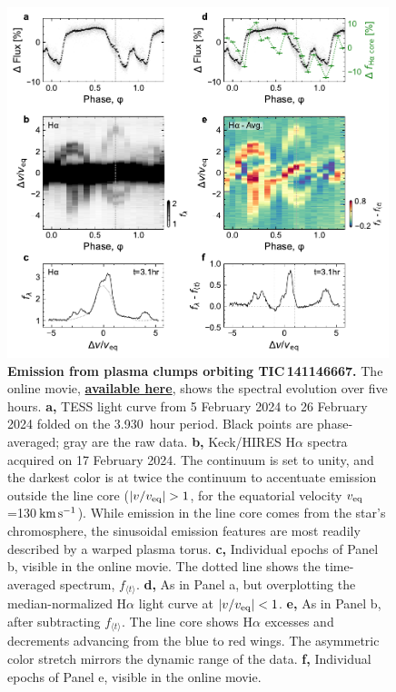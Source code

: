 \documentclass[11pt,twocolumn,tighten,linenumbers]{aastex7}
\newcommand{\kms}{\ensuremath{\rm km\,s^{-1}}}
\newcommand{\periodhr}{3.930}
\begin{document}
\begin{figure}[!t]
  \centering
  \includegraphics[width=0.99\textwidth]{f3.pdf}
  \vspace{-0.3cm}
  \captionsetup{labelformat=moviefmt,labelsep=colon}
	\caption{\textbf{Emission from plasma clumps orbiting
TIC\,141146667.}
  The online movie,
  \href{https://lgbouma.com/movies/TIC141146667_sixpanel.mp4}{{\bf
  available here}},
  shows the spectral evolution over five hours.
  {\bf a,} TESS light curve from 5 February 2024 to 26
  February 2024 folded on the \periodhr\ hour period.  Black
  points are phase-averaged; gray are the raw data.
  {\bf b,} Keck/HIRES H$\alpha$ spectra acquired on 17 February 2024.
  The continuum is set to unity, and the darkest color is at twice the
  continuum to accentuate emission outside the line core ($|v/v_{\rm
  eq}|>1$, for the equatorial velocity $v_{\rm eq}$=130\,\kms).  While
  emission in the line core comes from the star's chromosphere, the
  sinusoidal emission features are most readily described by a warped
  plasma torus.
  {\bf c,} Individual epochs of Panel b, visible in the online movie.
  The dotted line shows the time-averaged spectrum, $f_{\langle t
  \rangle}$.
  {\bf d,} As in Panel a, but overplotting the
  median-normalized H$\alpha$ light curve at $|v/v_{\rm eq}|<1$.
  {\bf e,} As in Panel b, after subtracting $f_{\langle t
  \rangle}$.  The line core shows H$\alpha$ excesses and decrements
  advancing from the blue to red wings.
  The asymmetric color stretch mirrors the dynamic range of the data.
  {\bf f,} Individual epochs of Panel e, visible in the online
  movie.  }
  \label{fig:spec}
\end{figure}
\end{document}
